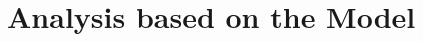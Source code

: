 \documentclass{mcmthesis}
\begin{document}
%
%

\section{Analysis based on the Model}
\end{document}
